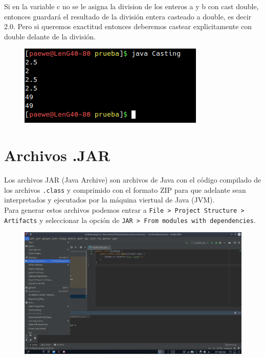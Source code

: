\documentclass{article}
\begin{document}
Si en la variable c no se le asigna la division de los enteros a y b con cast
double, entonces guardará el resultado de la división entera casteado a double,
es decir 2.0. Pero si queremos exactitud entonces deberemos castear
explicitamente con double delante de la división.

\begin{figure}[h!]
  \centering
  \includegraphics[scale=0.75]{./Pictures/044_Casting.png}
\end{figure}


\newpage
\section{Archivos .JAR}%
Los archivos JAR (Java Archive) son archivos de Java con el código compilado de
los archivos \texttt{.class} y comprimido con el formato ZIP para que adelante
sean interpretados y ejecutados por la máquina viertual de Java (JVM).\\

Para generar estos archivos podemos entrar a \texttt{File > Project Structure >
Artifacts} y seleccionar la opción de \texttt{JAR > From modules with
dependencies}.

\begin{figure}[h!]
  \centering
  \includegraphics[scale=0.45]{./Pictures/004_jar.png}
\end{figure}
\end{document}
